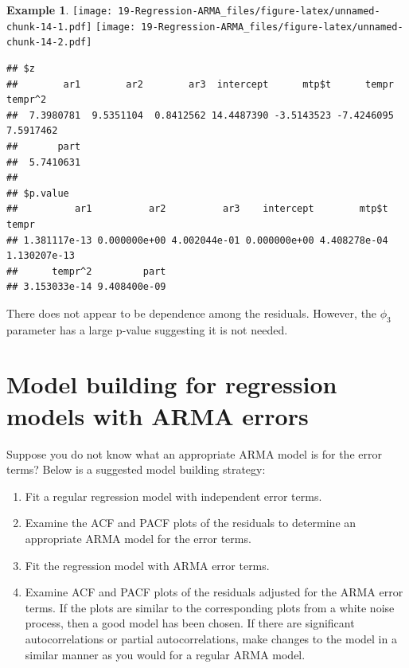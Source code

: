 \documentclass[
]{book}
\providecommand{\tightlist}{%
  \setlength{\itemsep}{0pt}\setlength{\parskip}{0pt}}
\theoremstyle{definition}
\theoremstyle{definition}
\newtheorem{example}{Example}[chapter]
\theoremstyle{definition}
\theoremstyle{definition}
\theoremstyle{remark}
\begin{document}
\begin{example}
\texttt{[image: 19-Regression-ARMA\_files/figure-latex/unnamed-chunk-14-1.pdf]} \texttt{[image: 19-Regression-ARMA\_files/figure-latex/unnamed-chunk-14-2.pdf]}

\begin{verbatim}
## $z
##        ar1        ar2        ar3  intercept      mtp$t      tempr    tempr^2 
##  7.3980781  9.5351104  0.8412562 14.4487390 -3.5143523 -7.4246095  7.5917462 
##       part 
##  5.7410631 
## 
## $p.value
##          ar1          ar2          ar3    intercept        mtp$t        tempr 
## 1.381117e-13 0.000000e+00 4.002044e-01 0.000000e+00 4.408278e-04 1.130207e-13 
##      tempr^2         part 
## 3.153033e-14 9.408400e-09
\end{verbatim}

There does not appear to be dependence among the residuals. However, the \(\phi_3\) parameter has a large p-value suggesting it is not needed.
\end{example}

\hypertarget{model-building-for-regression-models-with-arma-errors}{%
\section{Model building for regression models with ARMA errors}\label{model-building-for-regression-models-with-arma-errors}}

Suppose you do not know what an appropriate ARMA model is for the error terms? Below is a suggested model building strategy:

\begin{enumerate}
\def\labelenumi{\arabic{enumi}.}
\tightlist
\item
  Fit a regular regression model with independent error terms.\\
\item
  Examine the ACF and PACF plots of the residuals to determine an appropriate ARMA model for the error terms.\\
\item
  Fit the regression model with ARMA error terms.
\item
  Examine ACF and PACF plots of the residuals adjusted for the ARMA error terms. If the plots are similar to the corresponding plots from a white noise process, then a good model has been chosen. If there are significant autocorrelations or partial autocorrelations, make changes to the model in a similar manner as you would for a regular ARMA model.
\end{enumerate}
\end{document}

